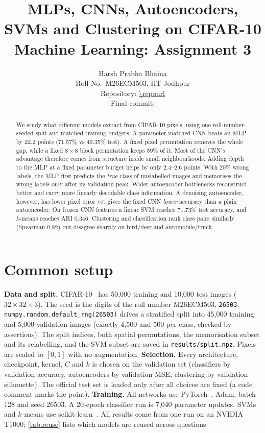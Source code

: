 \documentclass[10pt,twocolumn,letterpaper]{article}
\title{MLPs, CNNs, Autoencoders, SVMs and Clustering on CIFAR-10\\[2pt]
\large Machine Learning: Assignment 3}
\author{Harsh Prabha Bhaina\\
Roll No.\ M26ECM503, IIT Jodhpur\\
{\small Repository: \url{\repourl}}\\
{\small Final commit: \texttt{\commithash}}}
\begin{document}
\maketitle

\begin{abstract}
We study what different models extract from CIFAR-10 pixels, using one roll-number-seeded split and matched training budgets.
A parameter-matched CNN beats an MLP by 22.2 points (71.57\% vs 49.35\% test).
A fixed pixel permutation removes the whole gap, while a fixed $8{\times}8$ block permutation keeps 59\% of it.
Most of the CNN's advantage therefore comes from structure inside small neighbourhoods.
Adding depth to the MLP at a fixed parameter budget helps by only 2.4--2.6 points.
With 20\% wrong labels, the MLP first predicts the \emph{true} class of mislabelled images and memorises the wrong labels only after its validation peak.
Wider autoencoder bottlenecks reconstruct better and carry more linearly decodable class information.
A denoising autoencoder, however, has lower pixel error yet gives the fixed CNN \emph{lower} accuracy than a plain autoencoder.
On frozen CNN features a linear SVM reaches 71.73\% test accuracy, and $k$-means reaches ARI 0.346.
Clustering and classification rank class pairs similarly (Spearman 0.82) but disagree sharply on bird/deer and automobile/truck.
\end{abstract}

\section{Common setup}
\label{sec:setup}
\textbf{Data and split.} CIFAR-10~\cite{krizhevsky2009cifar} has 50,000 training and 10,000 test images ($32{\times}32{\times}3$).
The seed is the digits of the roll number M26ECM503, \texttt{26503}.
\texttt{numpy.random.default\_rng(26503)} drives a stratified split into 45,000 training and 5,000 validation images (exactly 4,500 and 500 per class, checked by assertions).
The split indices, both spatial permutations, the memorisation subset and its relabelling, and the SVM subset are saved in \texttt{results/split.npz}.
Pixels are scaled to $[0,1]$ with no augmentation.
\textbf{Selection.} Every architecture, checkpoint, kernel, $C$ and $k$ is chosen on the validation set (classifiers by validation accuracy, autoencoders by validation MSE, clustering by validation silhouette).
The official test set is loaded only after all choices are fixed (a code comment marks the point).
\textbf{Training.} All networks use PyTorch~\cite{paszke2019pytorch}, Adam, batch 128 and seed 26503.
A 20-epoch classifier run is 7,040 parameter updates.
SVMs and $k$-means use scikit-learn~\cite{pedregosa2011sklearn}.
All results come from one run on an NVIDIA T1000; \cref{tab:reuse} lists which models are reused across questions.
\end{document}

